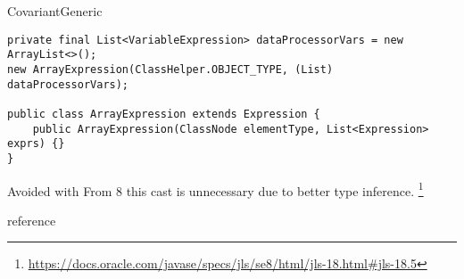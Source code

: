 \begin{pattern}{CovariantGeneric}
\begin{verbatim}
private final List<VariableExpression> dataProcessorVars = new ArrayList<>();
new ArrayExpression(ClassHelper.OBJECT_TYPE, (List) dataProcessorVars);

public class ArrayExpression extends Expression {
    public ArrayExpression(ClassNode elementType, List<Expression> exprs) {}
}
\end{verbatim}


\def\urlvar{http://bit.ly/EngineHub_WorldGuard_2IVUOx1}


\discussion{}
Avoided with
From \java{} 8 this cast is unnecessary due to better type inference.
\footnote{\url{https://docs.oracle.com/javase/specs/jls/se8/html/jls-18.html\#jls-18.5}}

reference \cite{altidorTamingWildcardsCombining2011}

\end{pattern}